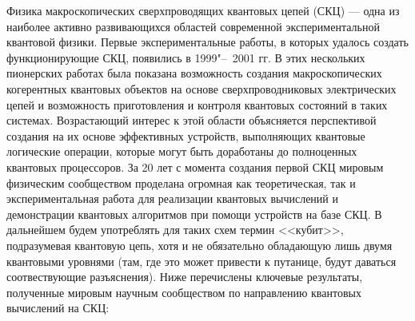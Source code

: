 {\actuality} 
Физика макроскопических сверхпроводящих квантовых цепей (СКЦ) --- одна из наиболее активно развивающихся областей современной экспериментальной квантовой физики. Первые экспериментальные работы, в которых удалось создать функционирующие СКЦ, появились в  1999"--~2001 гг. В этих нескольких пионерских работах \cite{nakamura1999coherent,mooij1999josephson,makhlin1999josephson,orlando1999superconducting} была показана  возможность создания макроскопических когерентных квантовых объектов на основе сверхпроводниковых электрических цепей и возможность приготовления и контроля квантовых состояний в таких системах. Возрастающий интерес к этой области объясняется перспективой создания на их основе эффективных устройств, выполняющих квантовые логические операции, которые могут быть доработаны до полноценных квантовых процессоров. За 20 лет с момента создания первой СКЦ мировым физическим сообществом проделана огромная как теоретическая, так и экспериментальная работа для реализации квантовых вычислений и демонстрации квантовых алгоритмов при помощи устройств на базе СКЦ. В дальнейшем будем употреблять для таких схем термин <<кубит>>, подразумевая квантовую цепь, хотя и не обязательно обладающую лишь двумя квантовыми уровнями (там, где это может привести к путанице, будут даваться соотвествующие разъяснения).  Ниже перечислены ключевые результаты, полученные мировым научным сообществом по направлению квантовых вычислений на СКЦ:

